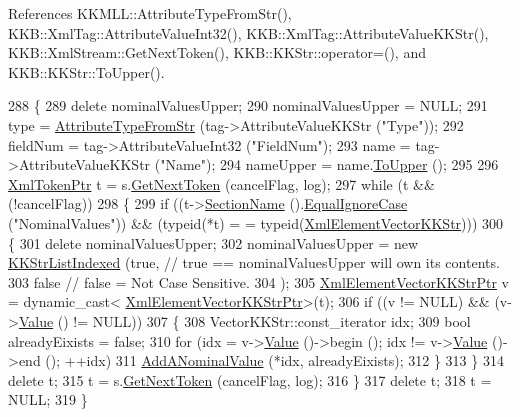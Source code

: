 References K\+K\+M\+L\+L\+::\+Attribute\+Type\+From\+Str(), K\+K\+B\+::\+Xml\+Tag\+::\+Attribute\+Value\+Int32(), K\+K\+B\+::\+Xml\+Tag\+::\+Attribute\+Value\+K\+K\+Str(), K\+K\+B\+::\+Xml\+Stream\+::\+Get\+Next\+Token(), K\+K\+B\+::\+K\+K\+Str\+::operator=(), and K\+K\+B\+::\+K\+K\+Str\+::\+To\+Upper().


\begin{DoxyCode}
288 \{
289   \textcolor{keyword}{delete}  nominalValuesUpper;
290   nominalValuesUpper = NULL;
291   type = \hyperlink{namespace_k_k_m_l_l_a6ce7dcc549393faf321ebfb02f426e9e}{AttributeTypeFromStr} (tag->AttributeValueKKStr (\textcolor{stringliteral}{"Type"}));
292   fieldNum = tag->AttributeValueInt32 (\textcolor{stringliteral}{"FieldNum"});
293   name = tag->AttributeValueKKStr (\textcolor{stringliteral}{"Name"});
294   nameUpper = name.\hyperlink{class_k_k_b_1_1_k_k_str_a13ea2544c491c5e93117a8f06deb9eff}{ToUpper} ();
295 
296   \hyperlink{class_k_k_b_1_1_xml_token}{XmlTokenPtr} t = s.\hyperlink{class_k_k_b_1_1_xml_stream_a87cc738b05c666cf5d5c25beaab477b4}{GetNextToken} (cancelFlag, log);
297   \textcolor{keywordflow}{while}  (t  &&  (!cancelFlag))
298   \{
299     \textcolor{keywordflow}{if}  ((t->\hyperlink{class_k_k_b_1_1_xml_token_a20aa05209eeafb58c1c595c15f07d504}{SectionName} ().\hyperlink{class_k_k_b_1_1_k_k_str_a562f9696417c53f66bc4088eac072ab5}{EqualIgnoreCase} (\textcolor{stringliteral}{"NominalValues"}))  &&  (\textcolor{keyword}{typeid}(*t) =
      = \textcolor{keyword}{typeid}(\hyperlink{namespace_k_k_b_ae7f117b12a72568bc7ab4a0322f2c4a4}{XmlElementVectorKKStr})))
300     \{
301       \textcolor{keyword}{delete}  nominalValuesUpper;
302       nominalValuesUpper = \textcolor{keyword}{new} \hyperlink{class_k_k_b_1_1_k_k_str_list_indexed}{KKStrListIndexed} (\textcolor{keyword}{true},   \textcolor{comment}{// true == nominalValuesUpper will
       own its contents.}
303                                                  \textcolor{keyword}{false}   \textcolor{comment}{// false = Not Case Sensitive.}
304                                                 );
305       \hyperlink{class_k_k_b_1_1_xml_element_template}{XmlElementVectorKKStrPtr} v = \textcolor{keyword}{dynamic\_cast<}
      \hyperlink{class_k_k_b_1_1_xml_element_template}{XmlElementVectorKKStrPtr}\textcolor{keyword}{>}(t);
306       \textcolor{keywordflow}{if}  ((v != NULL)  &&  (v->\hyperlink{class_k_k_b_1_1_xml_element_template_a3d671b57251b4b256fecb2197fc4a0f4}{Value} () != NULL))
307       \{
308         VectorKKStr::const\_iterator  idx;
309         \textcolor{keywordtype}{bool}  alreadyEixists = \textcolor{keyword}{false};
310         \textcolor{keywordflow}{for} (idx = v->\hyperlink{class_k_k_b_1_1_xml_element_template_a3d671b57251b4b256fecb2197fc4a0f4}{Value} ()->begin ();  idx != v->\hyperlink{class_k_k_b_1_1_xml_element_template_a3d671b57251b4b256fecb2197fc4a0f4}{Value} ()->end ();  ++idx)
311           \hyperlink{class_k_k_m_l_l_1_1_attribute_aca915581709a40bd7021a482d566fa48}{AddANominalValue} (*idx, alreadyEixists);
312       \}
313     \}
314     \textcolor{keyword}{delete} t;
315     t = s.\hyperlink{class_k_k_b_1_1_xml_stream_a87cc738b05c666cf5d5c25beaab477b4}{GetNextToken} (cancelFlag, log);
316   \}
317   \textcolor{keyword}{delete} t;
318   t = NULL;
319 \}
\end{DoxyCode}
